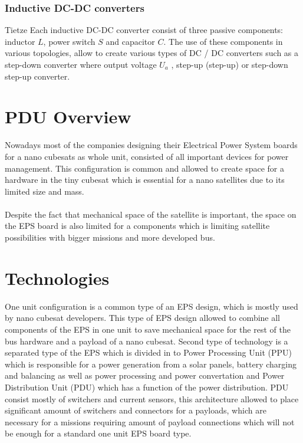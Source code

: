\subsubsection{Inductive DC-DC converters \label{sec:tech}}

Tietze\cite{18} Each inductive DC-DC converter consist of three passive components: inductor $L$, power switch $S$ and capacitor $C$. The use of these components in various topologies, allow to create various types of DC / DC converters such as a step-down converter where output voltage $U_{a}$  , step-up (step-up) or step-down step-up converter. 






\section{PDU Overview \label{sec:tech}}
Nowadays most of the companies designing their Electrical Power System boards for a nano cubesats as whole unit, consisted of all important devices for power management. This configuration is common and allowed to create space for a hardware in the tiny cubesat which is essential for a nano satellites due to its limited size and mass. 
\\ \\ Despite the fact that mechanical space of the satellite is important, the space on the EPS board is also limited for a components which is limiting satellite possibilities with bigger missions and more developed bus.  

\section{Technologies \label{sec:tech}}

One unit configuration is a common type of an EPS design, which is mostly used by nano cubesat developers. This type of EPS design allowed to combine all components of the EPS in one unit to save mechanical space for the rest of the bus hardware and a payload of a nano cubesat. Second type of technology is a separated type of the EPS which is divided in to Power Processing Unit (PPU) which is responsible for a power generation from a solar panels, battery charging and balancing as well as power processing and power convertation and Power Distribution Unit (PDU) which has a function of the power distribution. PDU consist mostly of switchers and current sensors, this architecture allowed to place significant amount of switchers and connectors for a payloads, which are necessary for a missions requiring amount of payload connections which will not be enough for a standard one unit EPS board type. \\
\\


